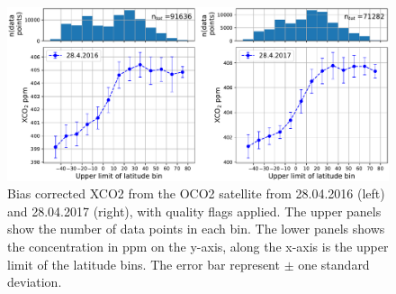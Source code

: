 \begin{figure}[htbp]
    \includegraphics[width=\textwidth]{../qa_xCO2.pdf}
    \caption{Bias corrected XCO2 from the OCO2 satellite from 28.04.2016 (left) 
    and 28.04.2017 (right), with quality flags applied. The upper panels 
    show the number of data points in each bin. The lower panels shows the  
    concentration in ppm on the y-axis, along the x-axis is the upper limit of
    the latitude bins. The error bar represent $\pm$ one standard deviation.}
    \label{fig:qa_xco2}

\end{figure}


